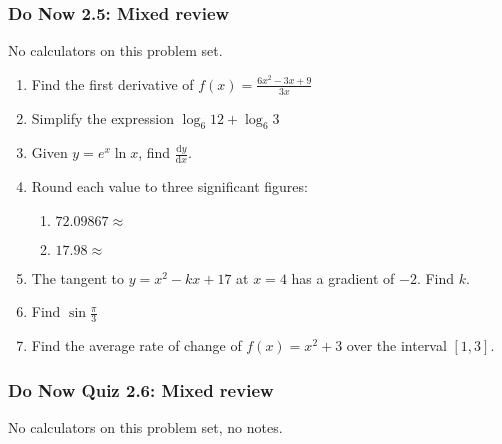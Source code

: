 \documentclass[12pt, oneside]{article}
\begin{document}
\subsubsection*{Do Now 2.5: Mixed review}
No calculators on this problem set.

\begin{enumerate}
  \item Find the first derivative of $\displaystyle f(x)=\frac{6x^2 - 3x + 9}{3x}$ \vspace{5cm}
  \item Simplify the expression $\log_6 12 + \log_6 3$ \vspace{3cm}
  \item Given $y=e^x \ln x$, find $\frac{\mathrm{d}y}{\mathrm{d}x}$. \vspace{6cm}
  \item Round each value to three significant figures:
  \begin{enumerate}
    \item $72.09867 \approx$ \vspace{2cm}
    \item $17.98 \approx$
  \end{enumerate}
  \newpage
  \item The tangent to $y=x^2-kx+17$ at $x=4$ has a gradient of $-2$. Find $k$. \vspace{8cm}
  \item Find $\sin \frac{\pi}{3}$ \vspace{3cm}
  \item Find the average rate of change of $f(x)=x^2+3$ over the interval $[1,3]$.

  \end{enumerate}

\newpage
\setcounter{page}{1}
\subsubsection*{Do Now Quiz 2.6: Mixed review}
No calculators on this problem set, no notes.
\end{document}
